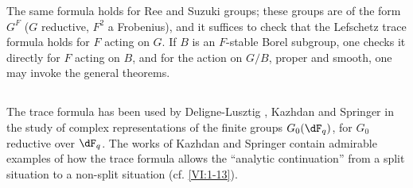 The same formula holds for Ree and Suzuki groups; these groups are
of the form $G^F$ ($G$ reductive, $F^2$ a Frobenius), and it suffices to
check that the Lefschetz trace formula holds for $F$ acting
on $G$. If $B$ is an $F$-stable Borel subgroup, one checks it
directly for $F$ acting on $B$, and for the action on $G/B$, proper and
smooth, one may invoke the general theorems. 





\subsection{}\label{VI:8-3}

The trace formula has been used by Deligne-Lusztig \cite{dl76},
Kazhdan \cite{ka77} and Springer \cite{sp76} in the study of
complex representations of the finite groups $G_0(\dF_q)$, for $G_0$
reductive over $\dF_q$. The works of Kazhdan and Springer contain
admirable examples of how the trace formula allows the ``analytic
continuation'' from a split situation to a non-split situation
(cf. \ref{VI:1-13}). 






